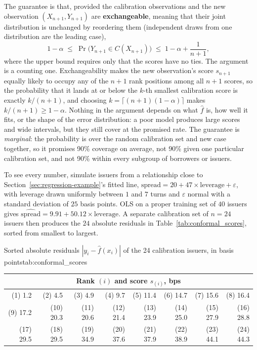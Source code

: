 \documentclass[../ai_in_finance]{subfiles}
\begin{document}
The guarantee is that, provided the calibration observations and the new observation $(X_{n+1}, Y_{n+1})$ are \textbf{exchangeable}, meaning that their joint distribution is unchanged by reordering them (independent draws from one distribution are the leading case),
\begin{equation}
\label{eq:ml-conformal-coverage}
1-\alpha \;\le\; \Pr\big(Y_{n+1} \in C(X_{n+1})\big) \;\le\; 1-\alpha + \frac{1}{n+1},
\end{equation}
where the upper bound requires only that the scores have no ties. The argument is a counting one. Exchangeability makes the new observation's score $s_{n+1}$ equally likely to occupy any of the $n+1$ rank positions among all $n+1$ scores, so the probability that it lands at or below the $k$-th smallest calibration score is exactly $k/(n+1)$, and choosing $k = \lceil (n+1)(1-\alpha)\rceil$ makes $k/(n+1) \ge 1-\alpha$. Nothing in the argument depends on what $\hat f$ is, how well it fits, or the shape of the error distribution: a poor model produces large scores and wide intervals, but they still cover at the promised rate. The guarantee is \emph{marginal}: the probability is over the random calibration set and new case together, so it promises 90\% coverage on average, not 90\% given one particular calibration set, and not 90\% within every subgroup of borrowers or issuers.


To see every number, simulate issuers from a relationship close to Section~\ref{sec:regression-example}'s fitted line, $\text{spread} = 20 + 47 \times \text{leverage} + \varepsilon$, with leverage drawn uniformly between $1$ and $7$ turns and $\varepsilon$ normal with a standard deviation of $25$ basis points. OLS on a proper training set of $40$ issuers gives $\widehat{\text{spread}} = 9.91 + 50.12 \times \text{leverage}$. A separate calibration set of $n = 24$ issuers then produces the $24$ absolute residuals in Table~\ref{tab:conformal_scores}, sorted from smallest to largest.

\begin{booktable}[htbp]{Sorted absolute residuals $|y_i - \hat f(x_i)|$ of the 24 calibration issuers, in basis points}{tab:conformal_scores}
\begin{tabular}{rrrrrrrr}
\toprule
\multicolumn{8}{c}{Rank $(i)$ and score $s_{(i)}$, bps} \\
\midrule
(1) 1.2 & (2) 4.5 & (3) 4.9 & (4) 9.7 & (5) 11.4 & (6) 14.7 & (7) 15.6 & (8) 16.4 \\
(9) 17.2 & (10) 20.3 & (11) 20.6 & (12) 21.4 & (13) 23.9 & (14) 25.0 & (15) 27.9 & (16) 28.8 \\
(17) 29.5 & (18) 29.5 & (19) 34.9 & (20) 37.6 & (21) 37.9 & (22) 38.9 & (23) 44.1 & (24) 44.3 \\
\bottomrule
\end{tabular}
\end{booktable}
\end{document}
